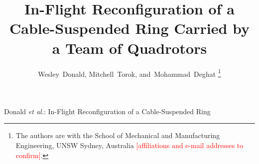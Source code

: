 \documentclass[journal]{IEEEtran}
\newcommand{\placeholder}[1]{\textcolor{red}{[#1]}}
\begin{document}
\title{In-Flight Reconfiguration of a Cable-Suspended Ring Carried by a Team of Quadrotors}

\author{Wesley~Donald, Mitchell~Torok, and~Mohammad~Deghat%
\thanks{The authors are with the School of Mechanical and Manufacturing Engineering, UNSW Sydney, Australia
\placeholder{affiliations and e-mail addresses to confirm}.}}

%
{Donald \MakeLowercase{\textit{et al.}}: In-Flight Reconfiguration of a Cable-Suspended Ring}

\maketitle















\end{document}
